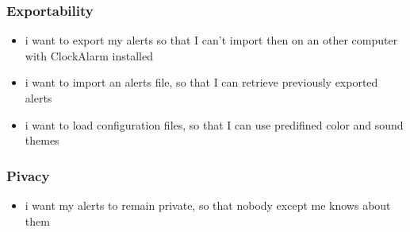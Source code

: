 \subsubsection{Exportability}
\begin{itemize}
	\item i want to export my alerts so that I can't import then on an other computer with ClockAlarm installed
	\item i want to import an alerts file, so that I can retrieve previously exported alerts
	\item i want to load configuration files, so that I can use predifined color and sound themes
\end{itemize}
\subsubsection{Pivacy}
\begin{itemize}
	\item i want my alerts to remain private, so that nobody except me knows about them
\end{itemize}